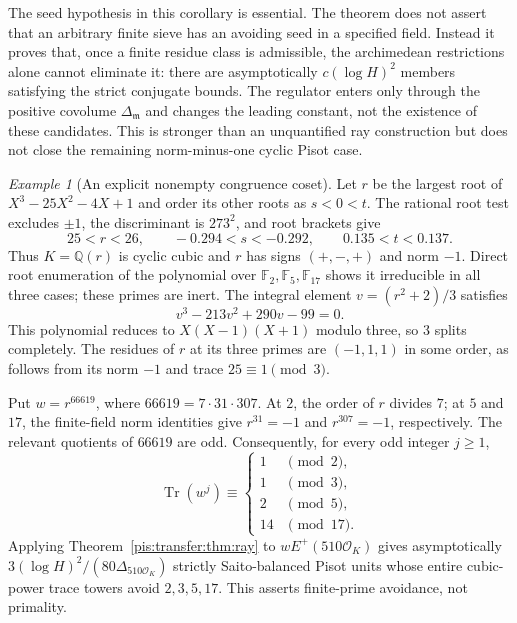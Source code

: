 \documentclass[11pt,a4paper]{article}
\theoremstyle{definition}\newtheorem{definition}[theorem]{Definition}
\theoremstyle{remark}\newtheorem{remark}[theorem]{Remark}
\newtheorem{example}[theorem]{Example}
\begin{document}
The seed hypothesis in this corollary is essential. The theorem does
not assert that an arbitrary finite sieve has an avoiding seed in a
specified field. Instead it proves that, once a finite residue class
is admissible, the archimedean restrictions alone cannot eliminate it:
there are asymptotically $c(\log H)^2$ members satisfying the strict
conjugate bounds. The regulator enters only through the positive
covolume $\Delta_{\mathfrak m}$ and changes the leading constant,
not the existence of these candidates. This is stronger than an
unquantified ray construction but does not close the remaining
norm-minus-one cyclic Pisot case.


\begin{example}[An explicit nonempty congruence coset]
\label{pis:transfer:ex:seed}
Let $r$ be the largest root of $X^3-25X^2-4X+1$ and order its other
roots as $s<0<t$. The rational root test excludes $\pm1$, the
discriminant is $273^2$, and root brackets give
\[
 25<r<26,\qquad -0.294<s<-0.292,\qquad 0.135<t<0.137.
\]
Thus $K=\mathbb Q(r)$ is cyclic cubic and $r$ has signs $(+,-,+)$
and norm $-1$. Direct root enumeration of the polynomial over
$\mathbb F_2,\mathbb F_5,\mathbb F_{17}$ shows it irreducible in all
three cases; these primes are inert. The integral element
$v=(r^2+2)/3$ satisfies
\[
 v^3-213v^2+290v-99=0.
\]
This polynomial reduces to $X(X-1)(X+1)$ modulo three, so $3$ splits
completely. The residues of $r$ at its three primes are
$(-1,1,1)$ in some order, as follows from its norm $-1$ and trace
$25\equiv1\pmod3$.

Put $w=r^{66619}$, where $66619=7\cdot31\cdot307$.
At $2$, the order of $r$ divides $7$; at $5$ and $17$, the finite-field
norm identities give $r^{31}=-1$ and $r^{307}=-1$, respectively.
The relevant quotients of $66619$ are odd. Consequently, for every
odd integer $j\ge1$,
\[
 \operatorname{Tr}(w^j)\equiv
 \begin{cases}
 1&\pmod2,\\
 1&\pmod3,\\
 2&\pmod5,\\
 14&\pmod{17}.
 \end{cases}
\]
Applying Theorem~\ref{pis:transfer:thm:ray} to
$wE^+(510\mathcal O_K)$ gives asymptotically
$3(\log H)^2/(80\Delta_{510\mathcal O_K})$ strictly Saito-balanced
Pisot units whose entire cubic-power trace towers avoid
$2,3,5,17$. This asserts finite-prime avoidance, not primality.
\end{example}

\end{document}
